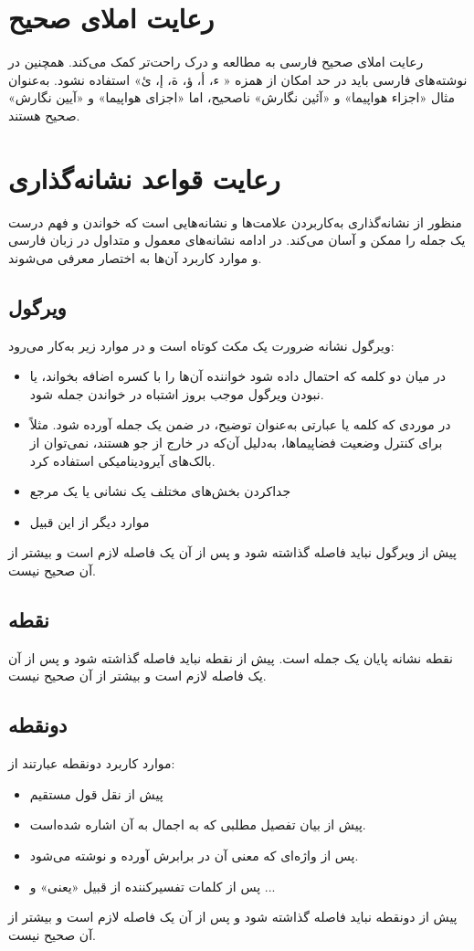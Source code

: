 \section{رعایت املای صحیح }
رعایت املای صحیح فارسی به مطالعه و درک راحت‌تر کمک می‌کند. همچنین در نوشته‌های فارسی باید در حد امکان از همزه « ء، أ، ؤ، ة، إ، ئ» استفاده نشود‌.‌ به‌عنوان مثال «اجزاء هواپیما» و «آئین نگارش» ناصحیح، اما «اجزای هواپیما» و «آیین نگارش» صحیح هستند.‌
\section{رعایت قواعد نشانه‌گذاری}
منظور از نشانه‌گذاری به‌کار‌بردن علامت‌ها و نشانه‌هایی است که خواندن و فهم درست یک جمله را ممکن و آسان می‌کند. در ادامه نشانه‌های معمول و متداول در زبان فارسی و موارد کاربرد آن‌ها به اختصار معرفی می‌شوند.
\subsection{ویرگول}
ویرگول نشانه ضرورت یک مکث کوتاه است و در موارد زیر به‌کار می‌رود:
\begin{itemize}
\item
در میان دو کلمه که احتمال داده شود خواننده آن‌ها را با کسره اضافه بخواند، یا نبودن ویرگول موجب بروز اشتباه در خواندن جمله شود.
\item
در موردی که کلمه یا عبارتی به‌‌‌‌عنوان توضیح، در ضمن یک جمله آورده شود. مثلاً برای کنترل وضعیت فضاپیماها، به‌دلیل آن‌که در خارج از جو هستند، نمی‌توان از بالک‌های آیرودینامیکی استفاده کرد.
\item
جدا‌کردن بخش‌های مختلف یک نشانی یا یک مرجع
\item
موارد دیگر از این قبیل
\end{itemize}
پیش از ویرگول نباید فاصله گذاشته شود و پس از آن یک فاصله لازم است و بیشتر از آن صحیح نیست.
\subsection{نقطه}
نقطه نشانه پایان یک جمله است. پیش از نقطه نباید فاصله گذاشته شود و پس از آن یک فاصله لازم است و بیشتر از آن صحیح نیست.
\subsection{دونقطه}
موارد کاربرد دونقطه عبارتند از:
\begin{itemize}
\item
پیش از نقل قول مستقیم
\item
پیش از بیان تفصیل مطلبی که به اجمال به آن اشاره شده‌است.
\item
پس از واژه‌ای که معنی آن در برابرش آورده و نوشته می‌شود.
\item
پس از کلمات تفسیر‌کننده از قبیل «یعنی» و ...
\end{itemize}
پیش از دونقطه نباید فاصله گذاشته شود و پس از آن یک فاصله لازم است و بیشتر از آن صحیح نیست.
